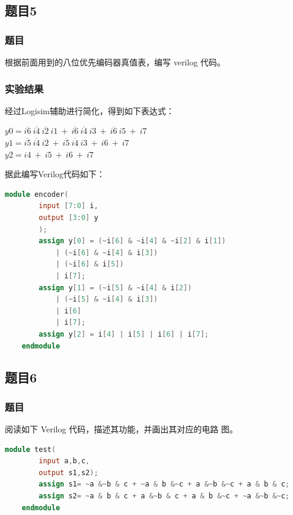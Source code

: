 \documentclass[UTF8]{article}
\begin{document}
	\subsection{题目5}
	\subsubsection{题目}
	根据前面用到的八位优先编码器真值表，编写 verilog 代码。\par
	\subsubsection{实验结果}
	经过Logisim辅助进行简化，得到如下表达式：\par
	\begin{center}
		$y0 = \overline{i6}\  \overline{i4}\ \overline{i2}\ i1\ +\ \overline{i6}\ \overline{i4}\ i3\ +\ \overline{i6}\ i5\ +\ i7$\\
		$y1 = \overline{i5}\ \overline{i4}\ i2\ +\ \overline{i5}\ \overline{i4}\ i3\ +\ i6\ +\ i7$\\
		$y2 = i4\ +\ i5\ +\ i6\ +\ i7$\\
	\end{center}\par
	据此编写Verilog代码如下：\par
	\begin{lstlisting}[language=Verilog]
	module encoder(
		input [7:0] i,
		output [3:0] y
		);
		assign y[0] = (~i[6] & ~i[4] & ~i[2] & i[1]) 
			| (~i[6] & ~i[4] & i[3]) 
			| (~i[6] & i[5]) 
			| i[7];
		assign y[1] = (~i[5] & ~i[4] & i[2]) 
			| (~i[5] & ~i[4] & i[3]) 
			| i[6] 
			| i[7];
		assign y[2] = i[4] | i[5] | i[6] | i[7];
	endmodule
	\end{lstlisting}\par
	
	\subsection{题目6}
	\subsubsection{题目}
	阅读如下 Verilog 代码，描述其功能，并画出其对应的电路
	图。
	\begin{lstlisting}[language=Verilog]
	module test(
		input a,b,c,
		output s1,s2);
		assign s1= ~a &~b & c + ~a & b &~c + a &~b &~c + a & b & c;
		assign s2= ~a & b & c + a &~b & c + a & b &~c + ~a &~b &~c;
	endmodule
	\end{lstlisting}\par
\end{document}
